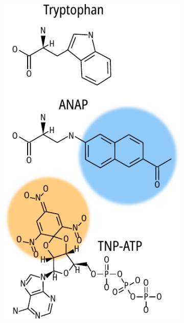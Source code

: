 \begin{figure}[h]
	\centering
	\begin{subfigure}[t]{0.4\textwidth}
		\caption{}\label{ch3fig:chemical_structures}
		\centering
		\includegraphics[width=\textwidth]{chemical_structures.pdf}
	\end{subfigure}
	\hfill
	\parbox[t]{0.5\textwidth}{
	\begin{subfigure}[t]{0.5\textwidth}
		\caption{}\label{ch3fig:spectral_overlap}
		\centering

\end{subfigure}}
\end{figure}
